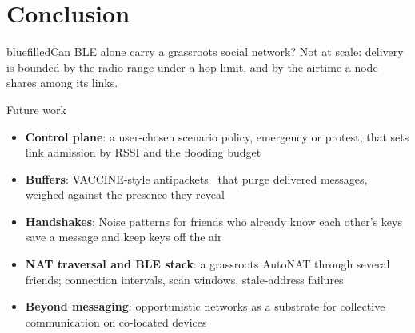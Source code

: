 \section{Conclusion}
\begin{frame}{}
    \begin{moepdef}{blue}{filled}{Can BLE alone carry a grassroots social network?}
        Not at scale: delivery is bounded by the radio range under a hop limit, and by the airtime a node shares among its links.
    \end{moepdef}
    \vspace{1ex}
\end{frame}

\begin{frame}{Future work}
    \begin{itemize}
        \item \textbf{Control plane}: a user-chosen scenario policy, emergency or protest, that sets link admission by RSSI and the flooding budget
        \item \textbf{Buffers}: VACCINE-style antipackets~\cite{Ott2010, Ott2011} that purge delivered messages, weighed against the presence they reveal
        \item \textbf{Handshakes}: Noise patterns for friends who already know each other's keys save a message and keep keys off the air
        \item \textbf{NAT traversal and BLE stack}: a grassroots AutoNAT through several friends; connection intervals, scan windows, stale-address failures
        \item \textbf{Beyond messaging}: opportunistic networks as a substrate for collective communication on co-located devices
    \end{itemize}
\end{frame}
